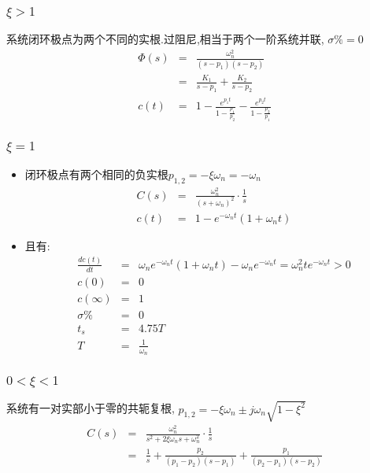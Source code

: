 \documentclass{beamer}
\begin{document}
\begin{frame}
\frametitle{$\xi>1$}
\label{sec-2-3}

   系统闭环极点为两个不同的实根.过阻尼,相当于两个一阶系统并联, $\sigma\%=0$
      \begin{eqnarray*}
      \Phi(s) & = & \frac{\omega_n^2}{(s-p_1)(s-p_2)} \\
              & = & \frac{K_1}{s-p_1}+\frac{K_2}{s-p_2}\\
      c(t)    &=& 1-\frac{e^{p_1 t}}{1-\frac{p_1}{p_2}}-\frac{e^{p_2 t}}{1-\frac{p_2}{p_1}}
      \end{eqnarray*}
\end{frame}
\begin{frame}
\frametitle{$\xi=1$}
\label{sec-2-4}

\begin{itemize}
\item <1-> 闭环极点有两个相同的负实根$p_{1,2}=-\xi\omega_n=-\omega_n$
      \begin{eqnarray*}
      C(s) & = &\frac{\omega_n^2}{(s+\omega_n)^2}\cdot\frac{1}{s} \\
      c(t) &=& 1-e^{-\omega_n t}(1+\omega_n t)
      \end{eqnarray*}
\item <2-> 且有:
      \begin{eqnarray*}
      \frac{dc(t)}{dt} &=& \omega_ne^{-\omega_n t}(1+\omega_n t)-\omega_n e^{-\omega_n t}
       =  \omega_n^2 te^{-\omega_n t} 
       >  0 \\
      c(0) &=&0 \\
      c(\infty)&=&1\\
      \sigma \% &=& 0\\
      t_s &=& 4.75T \\
      T &=&\frac{1}{\omega_n}
      \end{eqnarray*}
\end{itemize}
\end{frame}
\begin{frame}
\frametitle{$0<\xi<1$}
\label{sec-2-5}

系统有一对实部小于零的共轭复根, $p_{1,2}  =  -\xi\omega_n\pm j\omega_n\sqrt{1-\xi^2}$
\begin{eqnarray*}
C(s) &=& \frac{\omega_n^2}{s^2+2\xi\omega_n s+\omega_n^2}\cdot\frac{1}{s} \\
     &=& \frac{1}{s}+\frac{p_2}{(p_1-p_2)(s-p_1)}+\frac{p_1}{(p_2-p_1)(s-p_2)} 
\end{eqnarray*}
\end{frame}
\end{document}
